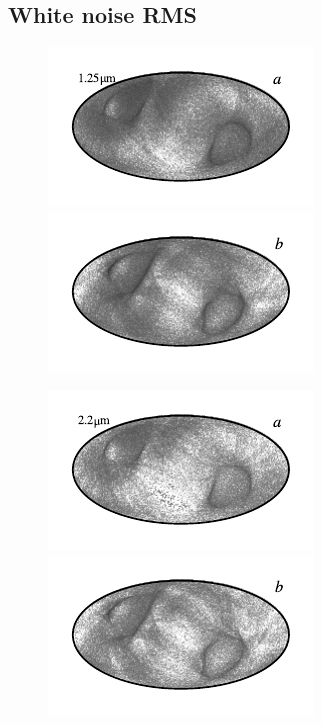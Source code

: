 \documentclass{aa}
\begin{document}
\subsection{White noise RMS}
\begin{figure}
	\centering
	\includegraphics{figs/rms_maps/rms_01a_c0001_000019.pdf}\includegraphics{figs/rms_maps/rms_01b_c0001_000019.pdf}
  \vspace*{-0.85cm}

	\includegraphics{figs/rms_maps/rms_02a_c0001_000019.pdf}\includegraphics{figs/rms_maps/rms_02b_c0001_000019.pdf}
  \vspace*{-0.85cm}


\end{figure}
\end{document}

